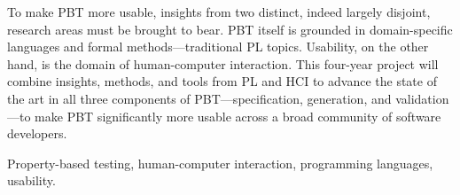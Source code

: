 

To make PBT more usable, insights from two distinct, indeed largely
disjoint, research areas
must be brought to bear.  PBT itself is grounded in domain-specific
languages and formal methods---traditional PL topics.  Usability, on
the other hand, is the domain of human-computer interaction.
%
This four-year project will combine insights, methods, and tools from
PL and HCI to advance the state of the art in all three components of
PBT---specification, generation, and validation---to make PBT
significantly more usable across a broad community of software developers.

\smallskip

 Property-based testing, human-computer
interaction, programming languages, usability.

